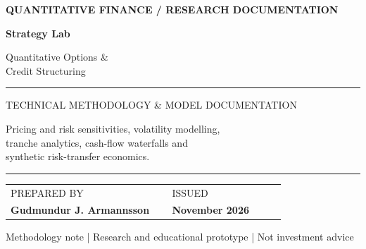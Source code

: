 \documentclass[10pt,a4paper]{article}
\numberwithin{equation}{section}
\begin{document}
\begin{titlepage}
\thispagestyle{empty}
\vspace*{39mm}
\hspace*{22mm}\begin{minipage}{0.78\textwidth}
{\sffamily\small\bfseries\color{Accent} QUANTITATIVE FINANCE \quad / \quad RESEARCH DOCUMENTATION}\par
\vspace{24mm}
{\sffamily\fontsize{38}{44}\selectfont\bfseries\color{Navy} Strategy Lab}\par
\vspace{9mm}
{\sffamily\fontsize{17}{23}\selectfont\color{Navy} Quantitative Options \&\\ Credit Structuring}\par
\vspace{13mm}
\textcolor{Accent}{\rule{31mm}{2.3pt}}\par
\vspace{13mm}
{\sffamily\normalsize\color{Muted} TECHNICAL METHODOLOGY \& MODEL DOCUMENTATION}\par
\vspace{10mm}
{\large\color{Ink}Pricing and risk sensitivities, volatility modelling,\\ tranche analytics, cash-flow waterfalls and\\ synthetic risk-transfer economics.}\par
\end{minipage}
\vfill
\hspace*{22mm}\begin{minipage}{0.78\textwidth}
\textcolor{Rule}{\rule{\linewidth}{0.6pt}}\par
\vspace{5mm}
\begin{tabular}{@{}p{0.54\linewidth}p{0.38\linewidth}@{}}
{\sffamily\footnotesize\color{Muted} PREPARED BY} & {\sffamily\footnotesize\color{Muted} ISSUED}\\[2mm]
{\sffamily\bfseries\color{Navy} Gudmundur J. Armannsson} & {\sffamily\bfseries\color{Navy} November 2026}\\
\end{tabular}
\vspace{13mm}
{\sffamily\scriptsize\color{Muted} Methodology note | Research and educational prototype | Not investment advice}\par
\end{minipage}
\vspace*{17mm}
\end{titlepage}
\end{document}
